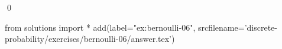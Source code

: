 
\begin{ex} 
  \label{ex:bernoulli-06}
  
  \qed
\end{ex} 
\begin{python0}
from solutions import *
add(label="ex:bernoulli-06",
    srcfilename='discrete-probability/exercises/bernoulli-06/answer.tex') 
\end{python0}
